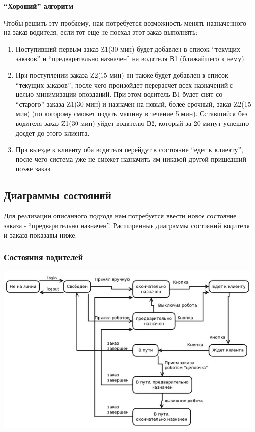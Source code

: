 		\textbf{“Хороший” алгоритм}

		Чтобы решить эту проблему, нам потребуется возможность менять назначенного на заказ водителя, если тот еще не поехал этот заказ выполнять:
		\begin{enumerate}

			\item{Поступивший первым заказ Z1(30 мин) будет добавлен в список “текущих заказов” и “предварительно назначен” на водителя В1 (ближайшего к нему).}

			\item{При поступлении заказа Z2(15 мин) он также будет добавлен в список “текущих заказов”, после чего произойдет перерасчет всех назначений с целью минимизации опозданий. При этом водитель В1 будет снят со “старого” заказа Z1(30 мин) и назначен на новый, более срочный, заказ Z2(15 мин) (по которому сможет подать машину в течение 5 мин). Оставшийся без водителя заказ Z1(30 мин) уйдет водителю В2, который за 20 минут успешно доедет до этого клиента.}

			\item{При выезде к клиенту оба водителя перейдут в состояние “едет к клиенту”, после чего система уже не сможет назначить им никакой другой пришедший позже заказ.}

		\end{enumerate}

	\subsection{Диаграммы состояний}

		Для реализации описанного подхода нам потребуется ввести новое состояние заказа - “предварительно назначен”. Расширенные диаграммы состояний водителя и заказа показаны ниже.

		\subsubsection{Состояния водителей}

			\includegraphics{images/appendices/drivers_state}


